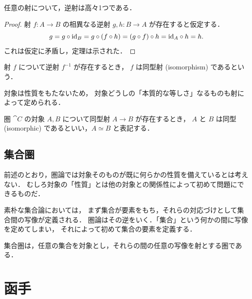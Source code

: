 \documentclass[titlepage]{ltjsreport}
\newtheorem[S]{theorem}{定理}[chapter]
\newtheorem[S]{definition}[theorem]{定義}
\newtheorem[S]{example}[theorem]{例}
\begin{document}
\begin{theorem}[逆射の一意性]
  任意の射について，逆射は高々1つである．
\end{theorem}

\begin{proof}
  射 $f:A\to B$ の相異なる逆射 $g,h:B\to A$ が存在すると仮定する．
  \begin{equation*}
    g=g\circ\mathrm{id}_{B}=g\circ(f\circ h)=(g\circ f)\circ h=\mathrm{id}_{A}\circ h=h.
  \end{equation*}
  これは仮定に矛盾し，定理は示された．
\end{proof}

\begin{definition}[同型射]
  射 $f$ について逆射 $f^{-1}$ が存在するとき，
  $f$ は同型射 (isomorphism) であるという．
\end{definition}

対象は性質をもたないため，
対象どうしの「本質的な等しさ」なるものも射によって定められる．

\begin{definition}[同型]
  圏 $\cat{C}$ の対象 $A,B$ について同型射 $A\to B$ が存在するとき，
  $A$ と $B$ は同型 (isomorphic) であるといい，$A\simeq B$ と表記する．
\end{definition}

\subsection{集合圏}

前述のとおり，圏論では対象そのものが既に何らかの性質を備えているとは考えない．
むしろ対象の「性質」とは他の対象との関係性によって初めて問題にできるものだ．

素朴な集合論においては，
まず集合が要素をもち，それらの対応づけとして集合間の写像が定義される．
圏論はその逆をいく．「集合」という何かの間に写像を定めてしまい，
それによって初めて集合の要素を定義する．

\begin{definition}[集合圏]
  集合圏は，任意の集合を対象とし，それらの間の任意の写像を射とする圏である．
\end{definition}

\section{函手}
\end{document}
